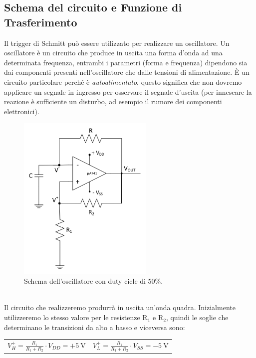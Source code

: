 \documentclass{report}
\begin{document}
\subsection{Schema del circuito e Funzione di Trasferimento}
Il trigger di Schmitt può essere utilizzato per realizzare un oscillatore. Un oscillatore è un circuito  che produce in uscita una forma d'onda ad una determinata frequenza, entrambi i parametri (forma e frequenza) dipendono sia dai componenti presenti nell'oscillatore che dalle tensioni di alimentazione. \`E un circuito particolare perché è \textit{autoalimentato}, questo significa che non dovremo applicare un segnale in ingresso per osservare il segnale d'uscita (per innescare la reazione è sufficiente un disturbo, ad esempio il rumore dei componenti elettronici).
\begin{figure}[h!]
	\centering
	\includegraphics[height=8cm]{immagini/schema3}
	\caption{Schema dell'oscillatore con duty cicle di 50\%.}
	\label{figura:schema3}
\end{figure}
\\Il circuito che realizzeremo produrrà in uscita un'onda quadra. Inizialmente utilizzeremo lo stesso valore per le resistenze $\mathrm{R_1}$ e $\mathrm{R_2}$, quindi le soglie che determinano le transizioni da alto a basso e viceversa sono:
\begin{table}[h!]
	\centering
	\begin{tabular}{cc}
		$\displaystyle{V_H^+=\frac{R_1}{R_1+R_2}\cdot V_{DD}=+\SI{5}{\volt}}$\;\;\;\;\;\;\;\;\;\;\;\;\;\;\;\;\;\;\;\; & $\displaystyle{V_L^+=\frac{R_1}{R_1+R_2}\cdot V_{SS}=-\SI{5}{\volt}}$\\ 
	\end{tabular}
\end{table}
\end{document}
